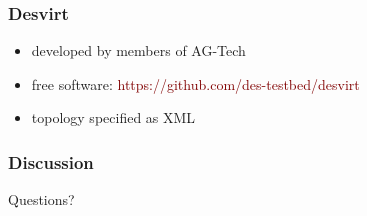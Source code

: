 \documentclass[ngerman,xcolor=svgnames]{beamer}
\begin{document}

\begin{frame}[fragile]
    \frametitle{Desvirt}
    \begin{itemize}
        \item developed by members of AG-Tech
        \item free software: \textcolor{Maroon}{https://github.com/des-testbed/desvirt}
        \item topology specified as XML
    \end{itemize}
    \pause
    
    \vspace{20pt}
\end{frame}


\begin{frame}
 \frametitle{Discussion}
 \huge{Questions?}
\end{frame}
\end{document}
